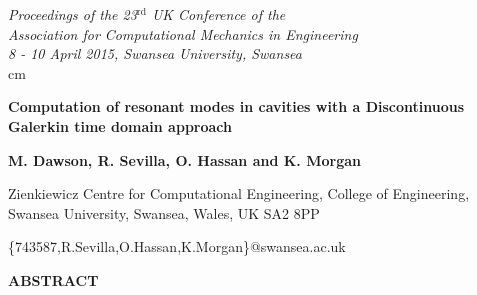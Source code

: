 \documentclass[times,11pt]{ACME2015article}
\begin{document}
\pagestyle{empty}

\begin{flushright}
{\fontsize{8}{10}
\it Proceedings of the 23$^\mathrm{rd}$ UK Conference of the\\
Association for Computational Mechanics in Engineering\\
8 - 10 April 2015, Swansea University, Swansea\\}  cm
\end{flushright}

\begin{center}
{\fontsize{14}{20}\bf Computation of resonant modes in cavities with a Discontinuous Galerkin time domain approach
}\end{center}


\begin{center}
\textbf{M. Dawson, R. Sevilla, O. Hassan and K. Morgan}\\
\end{center}

\begin{center}
{\fontsize{10}{12}
Zienkiewicz Centre for Computational Engineering, College of Engineering, Swansea University, Swansea, Wales, UK SA2 8PP\\
}\end{center}

\begin{center}
\{743587,R.Sevilla,O.Hassan,K.Morgan\}@swansea.ac.uk\\
\end{center}
%
\begin{center}
\textbf{ABSTRACT}\\[1mm]
\end{center}
%
\end{document}
